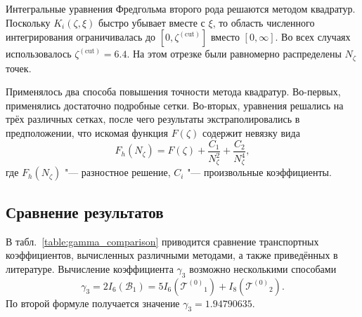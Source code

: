 \documentclass[a4paper,12pt]{article}
\newcommand{\T}[1]{\ensuremath{\mathcal{T}^{(#1)}}}
\begin{document}
Интегральные уравнения Фредгольма второго рода решаются методом квадратур.
Поскольку \(K_i(\zeta,\xi)\) быстро убывает вместе с \(\xi\),
то область численного интегрирования ограничивалась до \([0,\zeta^{(\mathrm{cut})}]\) вместо \([0,\infty]\).
Во всех случаях использовалось \(\zeta^{(\mathrm{cut})} = 6.4\).
На этом отрезке были равномерно распределены \(N_\zeta\) точек.

Применялось два способа повышения точности метода квадратур.
Во-первых, применялись достаточно подробные сетки.
Во-вторых, уравнения решались на трёх различных сетках, после чего результаты экстраполировались
в предположении, что искомая функция \(F(\zeta)\) содержит невязку вида
\begin{equation}
    F_h(N_\zeta) = F(\zeta) + \frac{C_1}{N_\zeta^2} + \frac{C_2}{N_\zeta^4},
\end{equation}
где \(F_h(N_\zeta)\) "--- разностное решение, \(C_i\) "--- произвольные коэффициенты.

\subsection{Сравнение результатов}

В табл.~\ref{table:gamma_comparison} приводится сравнение транспортных коэффициентов,
вычисленных различными методами, а также приведённых в литературе.
Вычисление коэффициента \(\gamma_3\) возможно несколькими способами
\begin{equation}
    \gamma_3 = 2I_6(\mathcal{B}_1) = 5I_6\left(\T{0}_1\right) + I_8\left(\T{0}_2\right).
\end{equation}
По второй формуле получается значение \(\gamma_3 = 1.94790635\).
\end{document}
